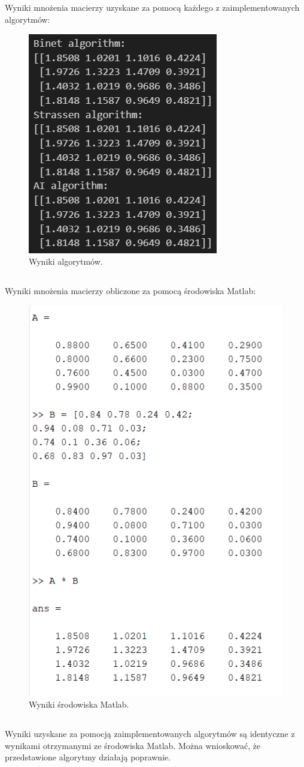 \documentclass[11pt, leqno]{scrartcl}
\begin{document}
    \subsection*{}
    Wyniki mnożenia macierzy uzyskane za pomocą każdego z zaimplementowanych
    algorytmów:
    \begin{figure}[H]
        \centering
        \includegraphics[width=0.5\linewidth]{porownanie_wyjscie_alg.png}
        \caption{Wyniki algorytmów.}
    \end{figure}

    \subsection*{}
    Wyniki mnożenia macierzy obliczone za pomocą środowiska Matlab:
    \begin{figure}[H]
        \centering
        \includegraphics[width=0.6\linewidth]{porownanie_wyjscie_matlab.png}
        \caption{Wyniki środowiska Matlab.}
    \end{figure}

    \subsection*{}
    Wyniki uzyskane za pomocją zaimplementowanych algorytmów są identyczne
    z wynikami otrzymanymi ze środowiska Matlab. Można wnioskować, że
    przedstawione algorytmy działają poprawnie.
\end{document}
